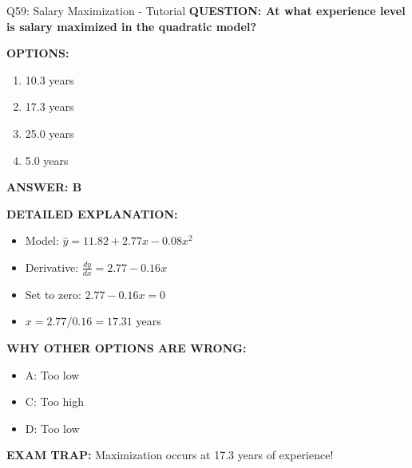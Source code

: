 \documentclass[8pt]{beamer}
\begin{document}
	\begin{frame}{Q59: Salary Maximization - Tutorial}
		\fontsize{6.5}{7.5}\selectfont
		\textbf{QUESTION: At what experience level is salary maximized in the quadratic model?}
		
		\vspace{0.1cm}
		\textbf{OPTIONS:}
		\begin{enumerate}
			\item 10.3 years
			\item 17.3 years
			\item 25.0 years
			\item 5.0 years
		\end{enumerate}
		
		\vspace{0.1cm}
		\textcolor{myblue}{\textbf{ANSWER: B}}
		
		\vspace{0.1cm}
		\textbf{DETAILED EXPLANATION:}
		\begin{itemize}
			\item Model: $\hat{y} = 11.82 + 2.77x - 0.08x^2$
			\item Derivative: $\frac{dy}{dx} = 2.77 - 0.16x$
			\item Set to zero: $2.77 - 0.16x = 0$
			\item $x = 2.77 / 0.16 = 17.31$ years
		\end{itemize}
		
		\vspace{0.1cm}
		\textcolor{myred}{\textbf{WHY OTHER OPTIONS ARE WRONG:}}
		\begin{itemize}
			\item \textcolor{myred}{A:} Too low
			\item \textcolor{myred}{C:} Too high
			\item \textcolor{myred}{D:} Too low
		\end{itemize}
		
		\textcolor{myred}{\textbf{EXAM TRAP:}} Maximization occurs at \textcolor{myblue}{17.3 years} of experience!
	\end{frame}
	
\end{document}
